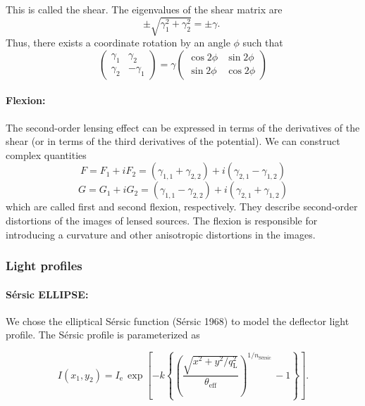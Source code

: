 \documentclass{aa}
\begin{document}
%
This is called the shear. The eigenvalues of the shear matrix are
$$
\pm \sqrt{\gamma_1^2+\gamma_2^2}= \pm \gamma \text {. }
$$
Thus, there exists a coordinate rotation by an angle $\phi$ such that
$$
\left(\begin{array}{cc}
\gamma_1 & \gamma_2 \\
\gamma_2 & -\gamma_1
\end{array}\right)=\gamma\left(\begin{array}{cc}
\cos 2 \phi & \sin 2 \phi \\
\sin 2 \phi & \cos 2 \phi
\end{array}\right)
$$

\paragraph{\textbf{Flexion:}} The second-order lensing effect can be expressed in terms of the derivatives of the shear (or in terms of the third derivatives of the potential). We can construct complex quantities
$$
F= F_1 + iF_2 = \left(\gamma_{\mathrm{1,1}} + \gamma_{\mathrm{2,2}}\right) + i\left(\gamma_{\mathrm{2,1}} - \gamma_{\mathrm{1,2}}\right)
$$
$$
G= G_1 + iG_2 = \left(\gamma_{\mathrm{1,1}} - \gamma_{\mathrm{2,2}}\right) + i\left(\gamma_{\mathrm{2,1}} + \gamma_{\mathrm{1,2}}\right)
$$
which are called first and second flexion, respectively. They describe second-order distortions of the images of lensed sources. The flexion is responsible for introducing a curvature and other anisotropic distortions
in the images.


\subsubsection{Light profiles} \label{sec:light_profile}
\paragraph{\textbf{S\'ersic ELLIPSE:}}
We chose the elliptical S\'ersic function (S\'ersic 1968) to model the deflector light profile. The S\'ersic profile is parameterized as

$$
I\left(x_1, y_2\right)=I_{\mathrm{e}}\, \exp \left[-k\left\{\left(\frac{\sqrt{x^2+y^2 / q_{\mathrm{L}}^2}}{\theta_{\mathrm{eff}}}\right)^{1 / n_{\text {S\'ersic }}}-1\right\}\right] .
$$
\end{document}
